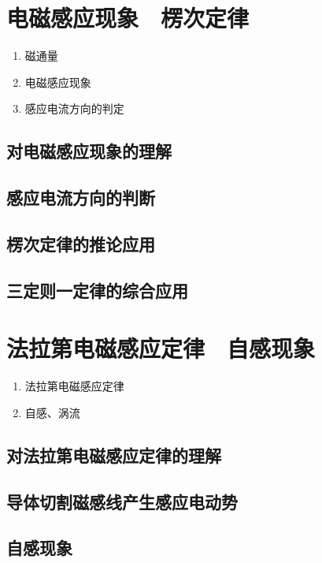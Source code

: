 \documentclass[cn,11pt, simple]{elegantbook}
\begin{document}
\chapter{电磁感应现象　楞次定律}
\begin{enumerate}
   \item 磁通量
   \item 电磁感应现象
   \item 感应电流方向的判定
\end{enumerate}

\clearpage\section{对电磁感应现象的理解}

\clearpage\section{感应电流方向的判断}

\clearpage\section{楞次定律的推论应用}

\clearpage\section{三定则一定律的综合应用}

\chapter{法拉第电磁感应定律　自感现象}
\begin{enumerate}
   \item 法拉第电磁感应定律
   \item 自感、涡流
\end{enumerate}

\clearpage\section{对法拉第电磁感应定律的理解}

\clearpage\section{导体切割磁感线产生感应电动势}

\clearpage\section{自感现象}
\end{document}
